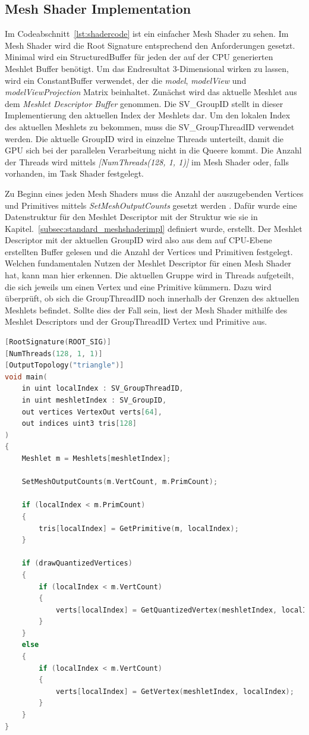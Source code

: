 \subsection{Mesh Shader Implementation}
\label{subsec:mesh_shader_impl}
Im Codeabschnitt~\ref{lst:shadercode} ist ein einfacher Mesh Shader zu sehen.
Im Mesh Shader wird die Root Signature entsprechend den Anforderungen gesetzt.
Minimal wird ein StructuredBuffer für jeden der auf der CPU generierten Meshlet Buffer benötigt.
Um das Endresultat 3-Dimensional wirken zu lassen, wird ein ConstantBuffer verwendet, der die \textit{model}, \textit{modelView} und \textit{modelViewProjection} Matrix beinhaltet.
Zunächst wird das aktuelle Meshlet aus dem \textit{Meshlet Descriptor Buffer} genommen.
Die SV\_GroupID stellt in dieser Implementierung den aktuellen Index der Meshlets dar.
Um den lokalen Index des aktuellen Meshlets zu bekommen, muss die SV\_GroupThreadID verwendet werden.
Die aktuelle GroupID wird in einzelne Threads unterteilt, damit die GPU sich bei der parallelen Verarbeitung nicht in die Queere kommt.
Die Anzahl der Threads wird mittels \textit{[NumThreads(128, 1, 1)]} im Mesh Shader oder, falls vorhanden, im Task Shader festgelegt. \newline

Zu Beginn eines jeden Mesh Shaders muss die Anzahl der auszugebenden Vertices und Primitives mittels \textit{SetMeshOutputCounts} gesetzt werden \cite{Jobalia2019}.
Dafür wurde eine Datenstruktur für den Meshlet Descriptor mit der Struktur wie sie in Kapitel.~\ref{subsec:standard_meshshaderimpl} definiert wurde, erstellt.
Der Meshlet Descriptor mit der aktuellen GroupID wird also aus dem auf CPU-Ebene erstellten Buffer gelesen und die Anzahl der Vertices und Primitiven festgelegt.
Welchen fundamentalen Nutzen der Meshlet Descriptor für einen Mesh Shader hat, kann man hier erkennen.
Die aktuellen Gruppe wird in Threads aufgeteilt, die sich jeweils um einen Vertex und eine Primitive kümmern.
Dazu wird überprüft, ob sich die GroupThreadID noch innerhalb der Grenzen des aktuellen Meshlets befindet.
Sollte dies der Fall sein, liest der Mesh Shader mithilfe des Meshlet Descriptors und der GroupThreadID Vertex und Primitive aus.

\newpage \begin{lstlisting}[language = C++, caption = Main Methode des Mesh Shaders, label=lst:shadercode]
[RootSignature(ROOT_SIG)]
[NumThreads(128, 1, 1)]
[OutputTopology("triangle")]
void main(
    in uint localIndex : SV_GroupThreadID,
    in uint meshletIndex : SV_GroupID,
    out vertices VertexOut verts[64],
    out indices uint3 tris[128]
)
{
  	Meshlet m = Meshlets[meshletIndex];

	SetMeshOutputCounts(m.VertCount, m.PrimCount);

	if (localIndex < m.PrimCount)
	{
  		tris[localIndex] = GetPrimitive(m, localIndex);
	}

	if (drawQuantizedVertices)
	{
  		if (localIndex < m.VertCount)
  		{
    		verts[localIndex] = GetQuantizedVertex(meshletIndex, localIndex);
  		}
	}
	else
	{
  		if (localIndex < m.VertCount)
  		{
    		verts[localIndex] = GetVertex(meshletIndex, localIndex);
  		}
	}
}
\end{lstlisting}

